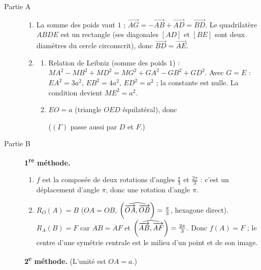 \begin{description}
	\item[Partie A]
	\begin{enumerate}
		\item {}
			La somme des poids vaut $1$ ; $\overrightarrow{AG} = -\overrightarrow{AB} + \overrightarrow{AD} = \overrightarrow{BD}$.
			Le quadrilatère $ABDE$ est un rectangle (ses diagonales $[AD]$ et $[BE]$ sont deux diamètres du cercle circonscrit), donc $\overrightarrow{BD} = \overrightarrow{AE}$.
			\par\noindent{}
		\item
		\begin{enumerate}
			\item {}
				Relation de Leibniz (somme des poids $1$) : $MA^2 - MB^2 + MD^2 = MG^2 + GA^2 - GB^2 + GD^2$.
				Avec $G = E$ : $EA^2 = 3a^2$, $EB^2 = 4a^2$, $ED^2 = a^2$ ; la constante est nulle.
				La condition devient $ME^2 = a^2$.
				\par\noindent{}
			\item {}
				$EO = a$ (triangle $OED$ équilatéral), donc \par\noindent{} ($(\Gamma)$ passe aussi par $D$ et $F$.)
		\end{enumerate}
	\end{enumerate}
	\item[Partie B]
	\textbf{1\textsuperscript{re} méthode.}
	\begin{enumerate}
		\item {}
			$f$ est la composée de deux rotations d'angles $\frac{\pi}{3}$ et $\frac{2\pi}{3}$ : c'est un déplacement d'angle $\pi$, donc une rotation d'angle $\pi$.
			\par\noindent{}
		\item {}
			$R_O(A) = B$ ($OA = OB$, $\left( \widehat{ \overrightarrow{OA} , \overrightarrow{OB} } \right) = \frac{\pi}{3}$, hexagone direct). $R_A(B) = F$ car $AB = AF$ et $\left( \widehat{ \overrightarrow{AB} , \overrightarrow{AF} } \right) = \frac{2\pi}{3}$.
			Donc $f(A) = F$ ; le centre d'une symétrie centrale est le milieu d'un point et de son image.
			\par\noindent{}
	\end{enumerate}
	\textbf{2\textsuperscript{e} méthode.} (L'unité est $OA = a$.)
	\begin{enumerate}

\end{enumerate}
\end{description}
